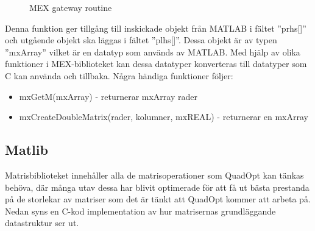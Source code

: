 \begin{figure}[H]

\caption{MEX gateway routine}
\label{fig:mex2}
\end{figure}  

Denna funktion ger tillgång till inskickade objekt från MATLAB i fältet ''prhs[]'' och utgående objekt ska läggas i fältet ''plhs[]''. Dessa objekt är av typen ''mxArray'' vilket är en datatyp som används av MATLAB. Med hjälp av olika funktioner i MEX-biblioteket kan dessa datatyper konverteras till datatyper som C kan använda och tillbaka. Några händiga funktioner följer:
\begin{itemize}
\item mxGetM(mxArray) - returnerar mxArray rader
\item mxCreateDoubleMatrix(rader, kolumner, mxREAL) - returnerar en mxArray
\end{itemize}



\subsection{Matlib}
Matrisbiblioteket innehåller alla de matrisoperationer som QuadOpt kan tänkas behöva, där många utav dessa har blivit optimerade för att få ut bästa prestanda på de storlekar av matriser som det är tänkt att QuadOpt kommer att arbeta på. Nedan syns en C-kod implementation av hur matrisernas grundläggande datastruktur ser ut. %





